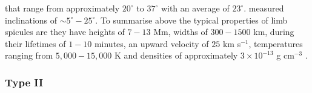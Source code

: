 \documentclass[12pt]{ociamthesis}
\begin{document}
that range from approximately $20^{\circ}$ \cite{Beckers1968} to $37^{\circ}$ \cite{Trujillo2005ApJ619L191T} with an average of $23^{\circ}$. \cite{Pereira2012} measured inclinations of $\sim 5^{\circ}-25^{\circ}$.   
To summarise above the typical properties of limb spicules are they have heights of $7-13$ Mm, widths of $300-1500$ km, during their lifetimes of $1-10$ minutes, an upward velocity of $25$ km s$^{-1}$, temperatures ranging from $5,000-15,000$ K and densities of approximately $3\times10^{-13}$ g cm$^{-3}$ \citep{Sterling_2000SoPh}.
\subsubsection{Type II}
\label{subsec:TII}
\end{document}
